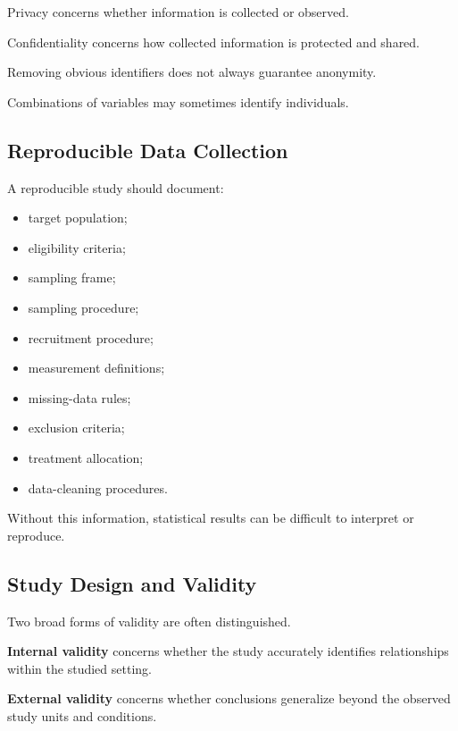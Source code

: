 Privacy concerns whether information is collected or observed.

Confidentiality concerns how collected information is protected and
shared.

Removing obvious identifiers does not always guarantee anonymity.

Combinations of variables may sometimes identify individuals.

\subsection{Reproducible Data Collection}
\label{subsec:reproducible-data-collection}

A reproducible study should document:

\begin{itemize}
    \item target population;
    \item eligibility criteria;
    \item sampling frame;
    \item sampling procedure;
    \item recruitment procedure;
    \item measurement definitions;
    \item missing-data rules;
    \item exclusion criteria;
    \item treatment allocation;
    \item data-cleaning procedures.
\end{itemize}

Without this information, statistical results can be difficult to
interpret or reproduce.

\subsection{Study Design and Validity}
\label{subsec:study-design-validity}

Two broad forms of validity are often distinguished.

\textbf{Internal validity} concerns whether the study accurately
identifies relationships within the studied setting.

\textbf{External validity} concerns whether conclusions generalize beyond
the observed study units and conditions.

